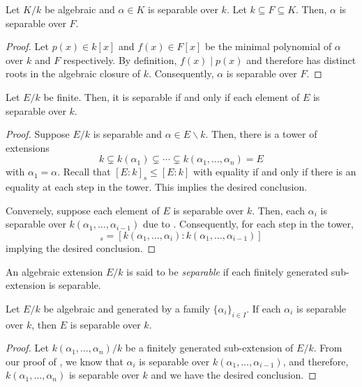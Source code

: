 \begin{lemma}
    Let $K/k$ be algebraic and $\alpha\in K$ is separable over $k$. Let $k\subseteq F\subseteq K$. Then, $\alpha$ is separable over $F$.
\end{lemma}
\begin{proof}
    Let $p(x)\in k[x]$ and $f(x)\in F[x]$ be the minimal polynomial of $\alpha$ over $k$ and $F$ respectively. By definition, $f(x)\mid p(x)$ and therefore has distinct roots in the algebraic closure of $k$. Consequently, $\alpha$ is separable over $F$.
\end{proof}

\begin{proposition}
    Let $E/k$ be finite. Then, it is separable if and only if each element of $E$ is separable over $k$.
\end{proposition}
\begin{proof}
    Suppose $E/k$ is separable and $\alpha\in E\backslash k$. Then, there is a tower of extensions 
    \begin{equation*}
        k\subsetneq k(\alpha_1)\subsetneq\cdots\subsetneq k(\alpha_1,\ldots,\alpha_n) = E
    \end{equation*}
    with $\alpha_1 = \alpha$. Recall that $[E:k]_s\le [E:k]$ with equality if and only if there is an equality at each step in the tower. This implies the desired conclusion.

    Conversely, suppose each element of $E$ is separable over $k$. Then, each $\alpha_i$ is separable over $k(\alpha_1,\ldots,\alpha_{i - 1})$ due to . Consequently, for each step in the tower, 
    \begin{equation*}
        [k(\alpha_1,\ldots,\alpha_i):k(\alpha_1,\ldots,\alpha_{i - 1})]_s = 
        [k(\alpha_1,\ldots,\alpha_i):k(\alpha_1,\ldots,\alpha_{i - 1})]
    \end{equation*}
    implying the desired conclusion.
\end{proof}

\begin{definition}
    An algebraic extension $E/k$ is said to be \textit{separable} if each finitely generated sub-extension is separable.
\end{definition}

\begin{theorem}
    Let $E/k$ be algebraic and generated by a family $\{\alpha_i\}_{i\in I}$. If each $\alpha_i$ is separable over $k$, then $E$ is separable over $k$.
\end{theorem}
\begin{proof}
    Let $k(\alpha_1,\ldots,\alpha_n)/k$ be a finitely generated sub-extension of $E/k$. From our proof of , we know that $\alpha_i$ is separable over $k(\alpha_1,\ldots,\alpha_{i - 1})$, and therefore, $k(\alpha_1,\ldots,\alpha_n)$ is separable over $k$ and we have the desired conclusion.
\end{proof}

